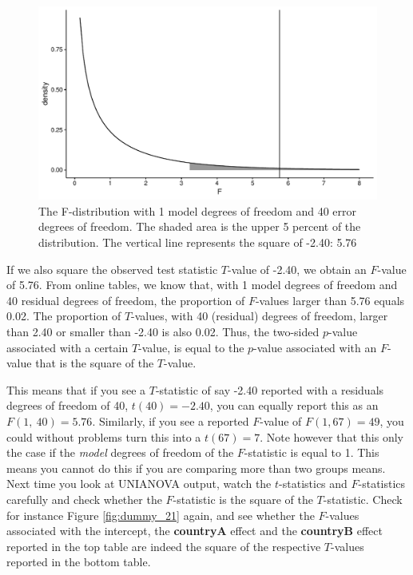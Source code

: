 \documentclass[]{book}\usepackage[]{graphicx}\usepackage[]{color}
\makeatletter
\def\maxwidth{ %
  \ifdim\Gin@nat@width>\linewidth
    \linewidth
  \else
    \Gin@nat@width
  \fi
}
\newenvironment{knitrout}{}{} %
\makeatother
\begin{document}
\begin{knitrout}
\color{fgcolor}\begin{figure}

{\centering \includegraphics[width=\maxwidth]{figure/dummy_25-1} 

}

\caption[The F-distribution with 1 model degrees of freedom and 40 error degrees of freedom]{The F-distribution with 1 model degrees of freedom and 40 error degrees of freedom. The shaded area is the upper 5 percent of the distribution. The vertical line represents the square of -2.40: 5.76}\label{fig:dummy_25}
\end{figure}


\end{knitrout}


If we also square the observed test statistic $T$-value of -2.40, we obtain an $F$-value of 5.76. From online tables, we know that, with 1 model degrees of freedom and 40 residual degrees of freedom, the proportion of $F$-values larger than 5.76 equals 0.02. The proportion of $T$-values, with 40 (residual) degrees of freedom, larger than 2.40 or smaller than -2.40 is also 0.02. Thus, the two-sided $p$-value associated with a certain $T$-value, is equal to the $p$-value associated with an $F$-value that is the square of the $T$-value. 

This means that if you see a $T$-statistic of say -2.40 reported with a residuals degrees of freedom of 40, $t(40)=-2.40$, you can equally report this as an $F(1,\ 40)=5.76$. Similarly, if you see a reported $F$-value of $F(1,67)=49$, you could without problems turn this into a $t(67)=7$. Note however that this only the case if the \textit{model} degrees of freedom of the $F$-statistic is equal to 1. This means you cannot do this if you are comparing more than two groups means. Next time you look at UNIANOVA output, watch the $t$-statistics and $F$-statistics carefully and check whether the $F$-statistic is the square of the $T$-statistic. Check for instance Figure \ref{fig:dummy_21} again, and see whether the $F$-values associated with the intercept, the \textbf{countryA} effect and the \textbf{countryB} effect reported in the top table are indeed the square of the respective $T$-values reported in the bottom table. 
\end{document}
